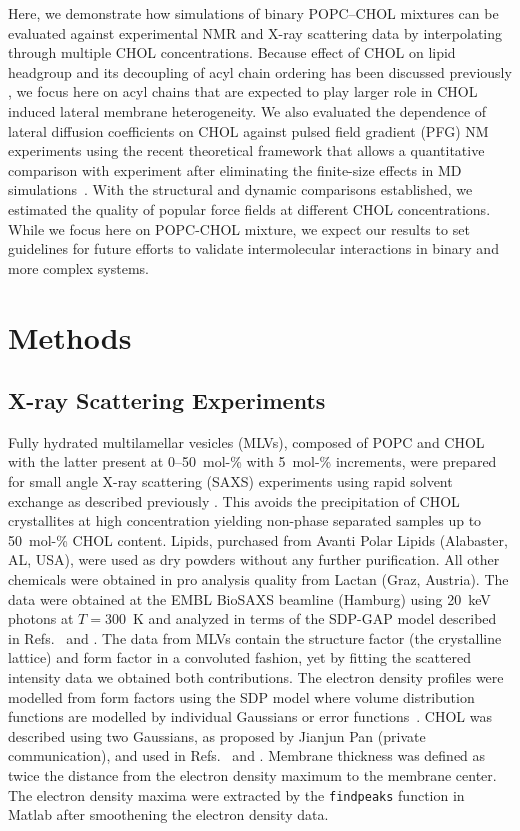 \documentclass[journal=jctcce]{achemso}
\begin{document}
Here, we demonstrate how simulations of binary POPC--CHOL mixtures can be evaluated against experimental NMR and X-ray scattering data by interpolating through multiple CHOL concentrations. Because effect of CHOL on lipid headgroup and its decoupling of acyl chain ordering has been discussed previously \cite{botan15,antila22b}, we focus here on acyl chains that are expected to play larger role in CHOL induced lateral membrane heterogeneity. We also evaluated the dependence of lateral diffusion coefficients on CHOL against pulsed field gradient (PFG) NM experiments \cite{filippov2003effect,filippov2003influence} using the recent theoretical framework that allows a quantitative comparison with experiment after eliminating the finite-size effects in MD simulations~\cite{vogele2016divergent,vogele2018hydrodynamics}. With the structural and dynamic comparisons established, we estimated the quality of popular force fields at different CHOL concentrations. While we focus here on POPC-CHOL mixture, we expect our results to set guidelines for future efforts to validate intermolecular interactions in binary and more complex systems. 

\section{Methods}

\subsection{X-ray Scattering Experiments}

Fully hydrated multilamellar vesicles (MLVs), composed of POPC and CHOL with the latter present at 0--50~mol-\% with 5~mol-\% increments, were prepared for small angle X-ray scattering (SAXS) experiments using rapid solvent exchange as described previously \cite{rieder2015optimizing,belivcka2017high}. This avoids the precipitation of CHOL crystallites at high concentration \cite{buboltz1999novel} yielding non-phase separated samples up to 50~mol-\% CHOL content. Lipids, purchased from Avanti Polar Lipids (Alabaster, AL, USA), were used as dry powders without any further purification. All other chemicals were obtained in pro analysis quality from Lactan (Graz, Austria). The data were obtained at the EMBL BioSAXS beamline (Hamburg) using 20~keV photons at $T=300$~K and analyzed in terms of the SDP-GAP model described in Refs.~ and . The data from MLVs contain the structure factor (the crystalline lattice) and form factor in a convoluted fashion, yet by fitting the scattered intensity data we obtained both contributions. The electron density profiles were modelled from form factors using the SDP model where volume distribution functions are modelled by individual Gaussians or error functions~\cite{heberle12,Kucerka08a,kucerka12}. CHOL was described using two Gaussians, as proposed by Jianjun Pan (private communication), and used in Refs.~ and . Membrane thickness was defined as twice the distance from the electron density maximum to the membrane center. The electron density maxima were extracted by the \texttt{findpeaks} function in Matlab after smoothening the electron density data.
\end{document}
